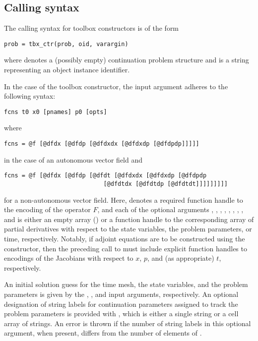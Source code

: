 \subsection{Calling syntax}
The calling syntax for toolbox constructors is of the form
\begin{lstlisting}[language=coco-highlight]
prob = tbx_ctr(prob, oid, varargin)
\end{lstlisting}
where  denotes a (possibly empty) continuation problem structure and  is a string representing an object instance identifier.

In the case of the  toolbox constructor, the  input argument adheres to the following syntax:
\begin{lstlisting}[language=coco-highlight]
fcns t0 x0 [pnames] p0 [opts]
\end{lstlisting}
where 
\begin{lstlisting}[language=coco-highlight]
fcns = @f [@dfdx [@dfdp [@dfdxdx [@dfdxdp [@dfdpdp]]]]]
\end{lstlisting}
in the case of an autonomous vector field and 
\begin{lstlisting}[language=coco-highlight]
fcns = @f [@dfdx [@dfdp [@dfdt [@dfdxdx [@dfdxdp [@dfdpdp 
                            [@dfdtdx [@dfdtdp [@dfdtdt]]]]]]]]]
\end{lstlisting}
for a non-autonomous vector field. Here,  denotes a required function handle to the encoding of the operator $F$, and each of the optional arguments , , , , , , , , and  is either an empty array (\mcode{[]}) or a function handle to the corresponding array of partial derivatives with respect to the state variables, the problem parameters, or time, respectively. Notably, if adjoint equations are to be constructed using the  constructor, then the preceding call to  must include explicit function handles to encodings of the Jacobians with respect to $x$, $p$, and (as appropriate) $t$, respectively. 

An initial solution guess for the time mesh, the state variables, and the problem parameters is given by the , , and  input arguments, respectively. An optional designation of string labels for continuation parameters assigned to track the problem parameters is provided with , which is either a single string or a cell array of strings. An error is thrown if the number of string labels in this optional argument, when present, differs from the number of elements of .

